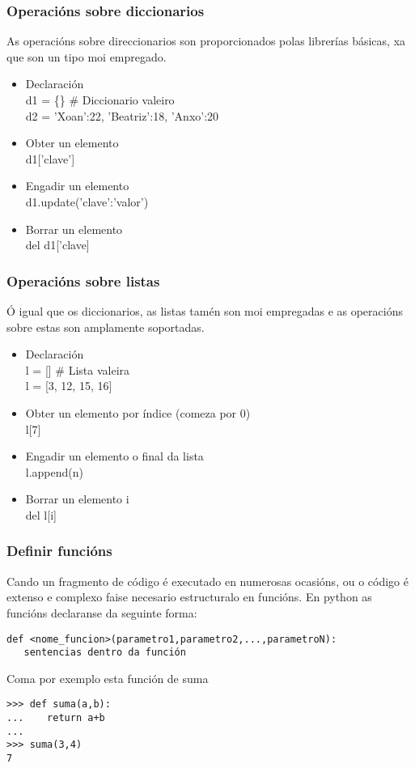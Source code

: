 \begin{frame}
  \frametitle{Operacións sobre diccionarios}
  As operacións sobre direccionarios son proporcionados polas librerías básicas,
  xa que son un tipo moi empregado.
  \begin{itemize}
  \item Declaración\\
    d1 = \{\} \# Diccionario valeiro\\
    d2 = {'Xoan':22, 'Beatriz':18, 'Anxo':20}
  \item Obter un elemento\\
    d1['clave']
  \item Engadir un elemento\\
    d1.update({'clave':'valor'})
  \item Borrar un elemento\\
    del d1['clave]
  \end{itemize}
\end{frame}

\begin{frame}
  \frametitle{Operacións sobre listas}
  Ó igual que os diccionarios, as listas tamén son moi empregadas e as
  operacións sobre estas son amplamente soportadas.
  \begin{itemize}
  \item Declaración\\
    l = [] \# Lista valeira\\
    l = [3, 12, 15, 16]
  \item Obter un elemento por índice (comeza por 0)\\
    l[7]
  \item Engadir un elemento o final da lista\\
    l.append(n)
  \item Borrar un elemento i\\
    del l[i]
  \end{itemize}
\end{frame}

\begin{frame}[fragile]
  \frametitle{Definir funcións}
  Cando un fragmento de código é executado en numerosas ocasións, ou o código é
  extenso e complexo faise necesario estructuralo en funcións. En python as
  funcións declaranse da seguinte forma:
  \small
\begin{verbatim}
def <nome_funcion>(parametro1,parametro2,...,parametroN):
   sentencias dentro da función
\end{verbatim}  
  \normalsize
  Coma por exemplo esta función de suma
  \small
\begin{verbatim}
>>> def suma(a,b):
...    return a+b
... 
>>> suma(3,4)
7
\end{verbatim}
  \normalsize
\end{frame}

